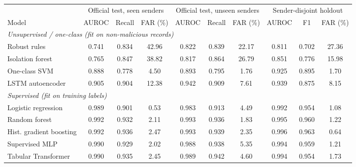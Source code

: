 \begin{tabular}{lccccccccc}
\toprule
& \multicolumn{3}{c}{Official test, seen senders} & \multicolumn{3}{c}{Official test, unseen senders} & \multicolumn{3}{c}{Sender-disjoint holdout} \\
\cmidrule(lr){2-4}\cmidrule(lr){5-7}\cmidrule(lr){8-10}
Model & AUROC & Recall & FAR (\%) & AUROC & Recall & FAR (\%) & AUROC & F1 & FAR (\%) \\
\midrule
\multicolumn{10}{l}{\textit{Unsupervised / one-class (fit on non-malicious records)}} \\
Robust rules & 0.741 & 0.834 & 42.96 & 0.822 & 0.839 & 22.17 & 0.811 & 0.702 & 27.36 \\
Isolation forest & 0.765 & 0.847 & 38.82 & 0.817 & 0.864 & 26.79 & 0.851 & 0.776 & 15.98 \\
One-class SVM & 0.888 & 0.778 & 4.50 & 0.893 & 0.795 & 1.76 & 0.925 & 0.895 & 1.70 \\
LSTM autoencoder & 0.905 & 0.904 & 12.38 & 0.942 & 0.909 & 7.61 & 0.939 & 0.875 & 8.15 \\
\midrule
\multicolumn{10}{l}{\textit{Supervised (fit on training labels)}} \\
Logistic regression & 0.989 & 0.901 & 0.53 & 0.983 & 0.913 & 4.49 & 0.992 & 0.954 & 1.08 \\
Random forest & 0.992 & 0.932 & 2.11 & 0.993 & 0.936 & 1.83 & 0.995 & 0.960 & 1.22 \\
Hist. gradient boosting & 0.992 & 0.936 & 2.47 & 0.993 & 0.939 & 2.35 & 0.996 & 0.963 & 0.64 \\
Supervised MLP & 0.990 & 0.929 & 2.02 & 0.988 & 0.938 & 5.35 & 0.994 & 0.959 & 1.21 \\
Tabular Transformer & 0.990 & 0.935 & 2.45 & 0.989 & 0.942 & 4.60 & 0.994 & 0.954 & 1.73 \\
\bottomrule
\end{tabular}
